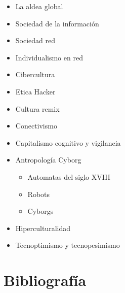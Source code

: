 \documentclass[]{book}
\providecommand{\tightlist}{%
  \setlength{\itemsep}{0pt}\setlength{\parskip}{0pt}}
\begin{document}
\begin{itemize}
\tightlist
\item
  La aldea global
\item
  Sociedad de la información
\item
  Sociedad red
\item
  Individualismo en red
\item
  Cibercultura
\item
  Etica Hacker
\item
  Cultura remix
\item
  Conectivismo
\item
  Capitalismo cognitivo y vigilancia
\item
  Antropología Cyborg

  \begin{itemize}
  \tightlist
  \item
    Automatas del siglo XVIII
  \item
    Robots
  \item
    Cyborgs
  \end{itemize}
\item
  Hiperculturalidad
\item
  Tecnoptimismo y tecnopesimismo
\end{itemize}

\hypertarget{bibliografuxeda-1}{%
\section*{Bibliografía}\label{bibliografuxeda-1}}
\end{document}

